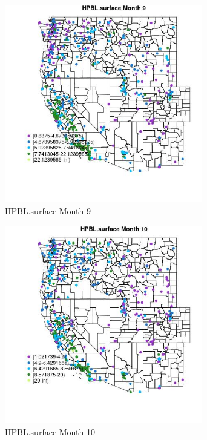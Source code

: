 \begin{figure} 
\centering  
\includegraphics[width=0.77\textwidth]{Code_Outputs/ML_input_report_ML_input_PM25_Step5_part_d_de_duplicated_aves_ML_input_MapObsMo9HPBLsurface.jpg} 
\caption{\label{fig:ML_input_report_ML_input_PM25_Step5_part_d_de_duplicated_aves_ML_inputMapObsMo9HPBLsurface}HPBL.surface Month 9} 
\end{figure} 
 

\clearpage 

\begin{figure} 
\centering  
\includegraphics[width=0.77\textwidth]{Code_Outputs/ML_input_report_ML_input_PM25_Step5_part_d_de_duplicated_aves_ML_input_MapObsMo10HPBLsurface.jpg} 
\caption{\label{fig:ML_input_report_ML_input_PM25_Step5_part_d_de_duplicated_aves_ML_inputMapObsMo10HPBLsurface}HPBL.surface Month 10} 
\end{figure} 
 

